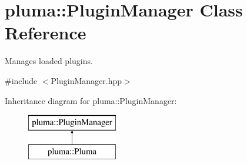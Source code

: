 \hypertarget{classpluma_1_1_plugin_manager}{}\section{pluma\+:\+:Plugin\+Manager Class Reference}
\label{classpluma_1_1_plugin_manager}


Manages loaded plugins.  




{\ttfamily \#include $<$Plugin\+Manager.\+hpp$>$}

Inheritance diagram for pluma\+:\+:Plugin\+Manager\+:\begin{figure}[H]
\begin{center}
\leavevmode
\includegraphics[height=2.000000cm]{classpluma_1_1_plugin_manager}
\end{center}
\end{figure}
